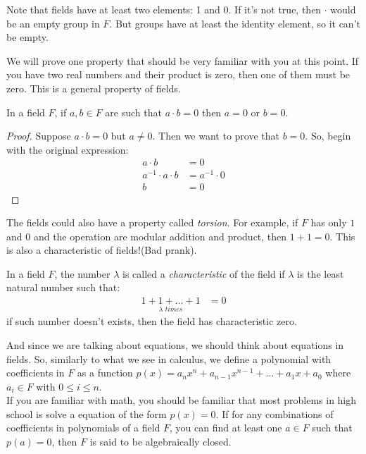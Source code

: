 \documentclass{tufte-handout}
\begin{document}
Note that fields have at least two elements: 1 and 0. If it's not true, then $\cdot$ would be an empty group in $F$. But groups have at least the identity element, so it can't be empty. 

We will prove one property that should be very familiar with you at this point. If you have two real numbers and their product is zero, then one of them must be zero. This is a general property of fields. 

\begin{theorem}
	In a field $F$, if $a, b \in F$ are such that $a \cdot b = 0$ then $a = 0$ or $b = 0$.
\end{theorem}
\begin{proof}
	Suppose $a \cdot b = 0$ but $a \neq 0$. Then we want to prove that $b = 0$. So, begin with the original expression:
	\begin{align*}
		a \cdot b &= 0\\
		a^{-1} \cdot a \cdot b &= a^{-1} \cdot 0\\
		b &= 0
	\end{align*}
\end{proof}

The fields could also have a property called \textit{torsion}. For example, if $F$ has only $1$ and $0$ and the operation are modular addition and product, then $1 + 1 = 0$. This is also a characteristic of fields!(Bad prank).

\begin{definition}
	In a field $F$, the number $\lambda$ is called a \textit{characteristic} of the field if $\lambda$ is the least natural number such that:
	\begin{align*}
		\underset{\lambda\, \, times}{1 + 1 + \dots + 1} &= 0
	\end{align*}
	if such number doesn't exists, then the field has characteristic zero.
\end{definition}

And since we are talking about equations, we should think about equations in fields. So, similarly to what we see in calculus, we define a polynomial with coefficients in $F$ as a function $p(x) = a_{n}x^n + a_{n-1}x^{n-1} + \dots + a_1x + a_0$ where $a_i \in F$ with $0 \le i \le n$.\\

If you are familiar with math, you should be familiar that most problems in high school is solve a equation of the form $p(x) = 0$. If for any combinations of coefficients in polynomials of a field $F$, you can find at least one $a \in F$ such that $p(a) = 0$, then $F$ is said to be algebraically closed.\\
\end{document}
